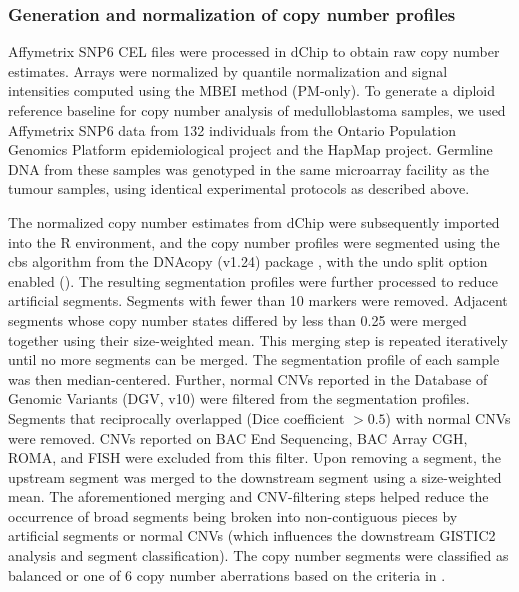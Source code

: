 \subsubsection{Generation and normalization of copy number profiles}

Affymetrix SNP6 CEL files were processed in dChip  to obtain raw copy number estimates. Arrays were normalized by quantile normalization and signal intensities computed using the MBEI method (PM-only). To generate a diploid reference baseline for copy number analysis of medulloblastoma samples, we used Affymetrix SNP6 data from 132 individuals from the Ontario Population Genomics Platform epidemiological project and the HapMap project. Germline DNA from these samples was genotyped in the same microarray facility as the tumour samples, using identical experimental protocols as described above.

The normalized copy number estimates from dChip were subsequently imported into the R environment, and the copy number profiles were segmented using the \gls{cbs} algorithm from the DNAcopy (v1.24) package , with the undo split option enabled (). The resulting segmentation profiles were further processed to reduce artificial segments. Segments with fewer than 10 markers were removed. Adjacent segments whose copy number states differed by less than 0.25 were merged together using their size-weighted mean. This merging step is repeated iteratively until no more segments can be merged. The segmentation profile of each sample was then median-centered. Further, normal CNVs reported in the Database of Genomic Variants (DGV, v10)  were filtered from the segmentation profiles. Segments that reciprocally overlapped (Dice coefficient $> 0.5$) with normal CNVs were removed. CNVs reported on BAC End Sequencing, BAC Array CGH, ROMA, and FISH were excluded from this filter. Upon removing a segment, the upstream segment was merged to the downstream segment using a size-weighted mean. The aforementioned merging and CNV-filtering steps helped reduce the occurrence of broad segments being broken into non-contiguous pieces by artificial segments or normal CNVs (which influences the downstream GISTIC2 analysis and segment classification). The copy number segments were classified as balanced or one of 6 copy number aberrations based on the criteria in .

